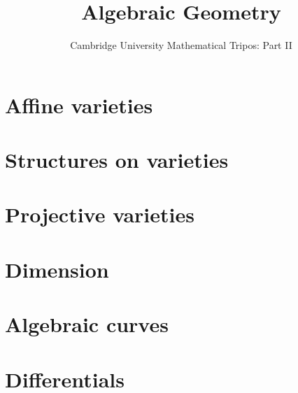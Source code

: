 \documentclass{article}
\title{Algebraic Geometry}
\author{Cambridge University Mathematical Tripos: Part II}
\begin{document}
\maketitle

\tableofcontentsnewpage{}


\section{Affine varieties}

\section{Structures on varieties}

\section{Projective varieties}

\section{Dimension}

\section{Algebraic curves}

\section{Differentials}

\end{document}
